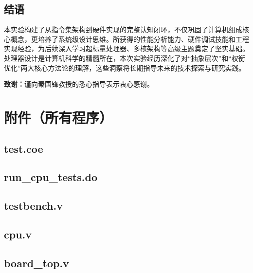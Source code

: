 \documentclass[12pt,a4paper]{article}
\begin{document}
\subsection*{结语}
本实验构建了从指令集架构到硬件实现的完整认知闭环，不仅巩固了计算机组成核心概念，更培养了系统级设计思维。所获得的性能分析能力、硬件调试技能和工程实现经验，为后续深入学习超标量处理器、多核架构等高级主题奠定了坚实基础。处理器设计是计算机科学的精髓所在，本次实验经历深化了对``抽象层次''和``权衡优化''两大核心方法论的理解，这些洞察将长期指导未来的技术探索与研究实践。

\vspace{1em}
\noindent\textbf{致谢：}谨向秦国锋教授的悉心指导表示衷心感谢。

\section{附件（所有程序）}

\subsection{test.coe}
\begingroup
\footnotesize
\linespread{0.8}\selectfont

\endgroup
\clearpage

\subsection{run\_cpu\_tests.do}
\begingroup
\footnotesize
\linespread{0.8}\selectfont

\endgroup
\clearpage

\subsection{testbench.v}
\begingroup
\footnotesize
\linespread{0.8}\selectfont

\endgroup
\clearpage

\subsection{cpu.v}
\begingroup
\footnotesize
\linespread{0.8}\selectfont

\endgroup
\clearpage

\subsection{board\_top.v}
\begingroup
\footnotesize
\linespread{0.8}\selectfont

\endgroup
\clearpage
\end{document}
